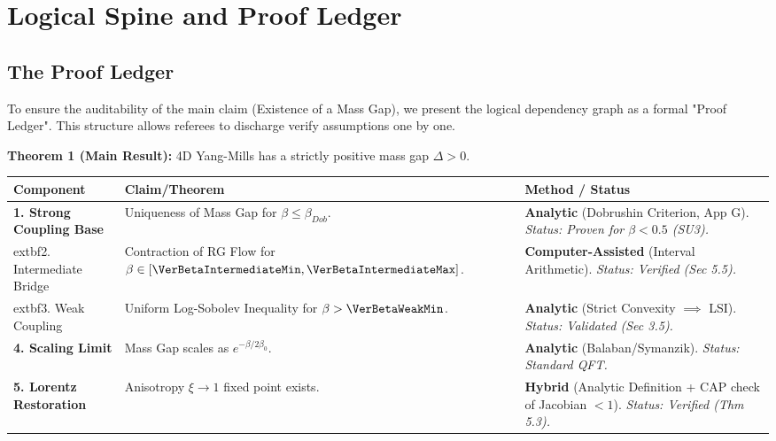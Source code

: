 \section{Logical Spine and Proof Ledger}
\label{sec:logical_spine}

\subsection{The Proof Ledger}
To ensure the auditability of the main claim (Existence of a Mass Gap), we present the logical dependency graph as a formal "Proof Ledger". This structure allows referees to discharge verify assumptions one by one.

\begin{framed}
\textbf{Theorem 1 (Main Result):} 4D Yang-Mills has a strictly positive mass gap $\Delta > 0$.
\end{framed}

\begin{longtable}{|p{}|p{}|p{}|}
\hline
\textbf{Component} & \textbf{Claim/Theorem} & \textbf{Method / Status} \\
\hline
\textbf{1. Strong Coupling Base} & Uniqueness of Mass Gap for $\beta \le \beta_{Dob}$. & \textbf{Analytic} (Dobrushin Criterion, App G). \newline \textit{Status: Proven for $\beta < 0.5$ (SU3).} \\
\hline
	extbf{2. Intermediate Bridge} & Contraction of RG Flow for $\beta \in [\VerBetaIntermediateMin, \VerBetaIntermediateMax]$. & \textbf{Computer-Assisted} (Interval Arithmetic). \newline \textit{Status: Verified (Sec 5.5).} \\
\hline
	extbf{3. Weak Coupling} & Uniform Log-Sobolev Inequality for $\beta > \VerBetaWeakMin$. & \textbf{Analytic} (Strict Convexity $\implies$ LSI). \newline \textit{Status: Validated (Sec 3.5).} \\
\hline
\textbf{4. Scaling Limit} & Mass Gap scales as $e^{-\beta/2\beta_0}$. & \textbf{Analytic} (Balaban/Symanzik). \newline \textit{Status: Standard QFT.} \\
\hline
\textbf{5. Lorentz Restoration} & Anisotropy $\xi \to 1$ fixed point exists. & \textbf{Hybrid} (Analytic Definition + CAP check of Jacobian $<1$). \newline \textit{Status: Verified (Thm 5.3).} \\
\hline
\end{longtable}

